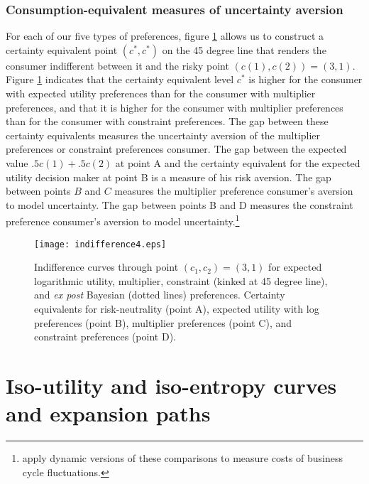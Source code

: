 \subsubsection{Consumption-equivalent measures of uncertainty aversion}

For each of our five types of preferences, figure \ref{fig_indifference4} allows us to construct a certainty equivalent point $(c^*, c^*)$ on the 45 degree line that renders  the consumer  indifferent between it and  the risky point $(c(1), c(2)) = (3,1)$. Figure \ref{fig_indifference4} indicates that  the certainty
equivalent level $c^*$ is higher for the  consumer with expected utility preferences than for the consumer with multiplier preferences, and that it
is higher for  the consumer with multiplier preferences than for the consumer with constraint preferences.
The gap between these certainty equivalents measures  the uncertainty aversion of the multiplier preferences or constraint  preferences consumer.  The gap between
the expected value $.5 c(1) + .5 c(2)$ at point A and the certainty equivalent %
 for the expected utility decision maker at point B is a measure
of his risk aversion.  %
 The gap
 between points $B$ and $C$ measures the multiplier preference consumer's aversion to model uncertainty.  The gap between points B and D measures the constraint preference consumer's aversion
 to model uncertainty.\footnote{\citet{bhs2007} apply  dynamic versions of these comparisons
 to measure costs of business cycle fluctuations.}




\begin{figure}[htp]
\centering
\texttt{[image: indifference4.eps]}
\caption[Indifference curves]{Indifference curves through point $(c_1,c_2)=(3,1)$ %
 for expected logarithmic utility,  multiplier,  constraint (kinked at 45 degree line),
and {\em ex post} Bayesian (dotted lines) preferences. Certainty equivalents for risk-neutrality (point A), expected utility with log preferences (point B),
multiplier preferences (point C), and constraint preferences (point D).}\label{fig_indifference4}
\end{figure}

\section{Iso-utility and iso-entropy curves and expansion paths}



